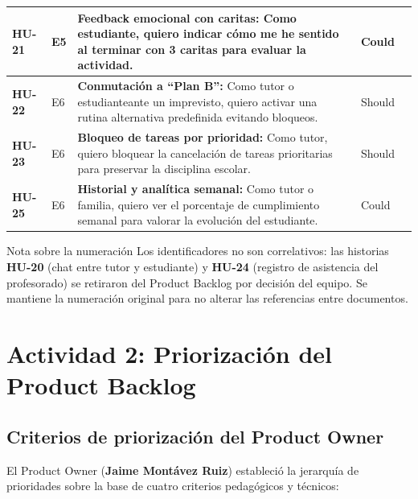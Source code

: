 \documentclass[11pt,a4paper]{article}
\begin{document}
{\begin{longtable}{|>{\centering\bfseries\arraybackslash}p{1.3cm}|>{\centering\arraybackslash}p{1.1cm}|>{\raggedright\arraybackslash}p{7.4cm}|>{\centering\arraybackslash}p{1.6cm}|>{\centering\arraybackslash}p{0.8cm}|}
HU-21 & E5 & \textbf{Feedback emocional con caritas:} Como estudiante, quiero indicar cómo me he sentido al terminar con 3 caritas para evaluar la actividad. & Could & 2 \\ \hline
HU-22 & E6 & \textbf{Conmutación a ``Plan B'':} Como tutor o estudianteante un imprevisto, quiero activar una rutina alternativa predefinida evitando bloqueos. & Should & 5 \\ \hline
HU-23 & E6 & \textbf{Bloqueo de tareas por prioridad:} Como tutor, quiero bloquear la cancelación de tareas prioritarias para preservar la disciplina escolar. & Should & 3 \\ \hline
HU-25 & E6 & \textbf{Historial y analítica semanal:} Como tutor o familia, quiero ver el porcentaje de cumplimiento semanal para valorar la evolución del estudiante. & Could & 3 \\ \hline
\end{longtable}}

\begin{verde}{Nota sobre la numeración}
Los identificadores no son correlativos: las historias \textbf{HU-20} (chat entre tutor y estudiante) y \textbf{HU-24} (registro de asistencia del profesorado) se retiraron del Product Backlog por decisión del equipo. Se mantiene la numeración original para no alterar las referencias entre documentos.
\end{verde}

\section{Actividad 2: Priorización del Product Backlog}
\subsection{Criterios de priorización del Product Owner}
El Product Owner (\textbf{Jaime Montávez Ruiz}) estableció la jerarquía de prioridades sobre la base de cuatro criterios pedagógicos y técnicos:
\end{document}
